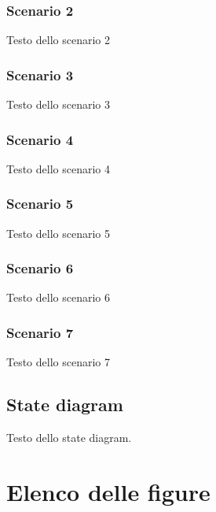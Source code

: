 \documentclass[12pt]{article}
\begin{document}
\subsubsection{Scenario 2}
Testo dello scenario 2
\subsubsection{Scenario 3}
Testo dello scenario 3
\subsubsection{Scenario 4}
Testo dello scenario 4
\subsubsection{Scenario 5}
Testo dello scenario 5
\subsubsection{Scenario 6}
Testo dello scenario 6
\subsubsection{Scenario 7}
Testo dello scenario 7

\subsection{State diagram}
Testo dello state diagram.

\section*{Elenco delle figure}
\end{document}
